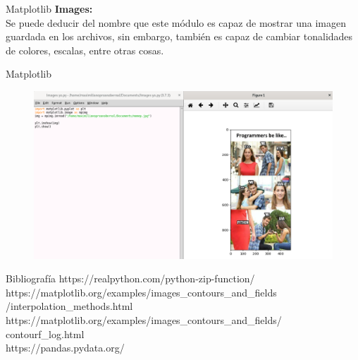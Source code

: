 \documentclass{beamer}
\begin{document}
\begin{frame}{Matplotlib}
	\textbf{Images:}\\ Se puede deducir del nombre que este módulo es capaz de mostrar una imagen guardada en los archivos, sin embargo, también es capaz de cambiar tonalidades de colores, escalas, entre otras cosas.
\end{frame}

\begin{frame}{Matplotlib}
	\begin{figure}
	\centering
	\includegraphics[width=1.0\linewidth]{"../Python/Captura Images"}
	\caption{}
	\label{fig:captura-images}
\end{figure}

\end{frame}

\begin{frame}{Bibliografía}
	https://realpython.com/python-zip-function/\\
	https://matplotlib.org/examples/images\_contours\_and\_fields\\/interpolation\_methods.html
	https://matplotlib.org/examples/images\_contours\_and\_fields/\\contourf\_log.html\\
	https://pandas.pydata.org/
	
\end{frame}
\end{document}
